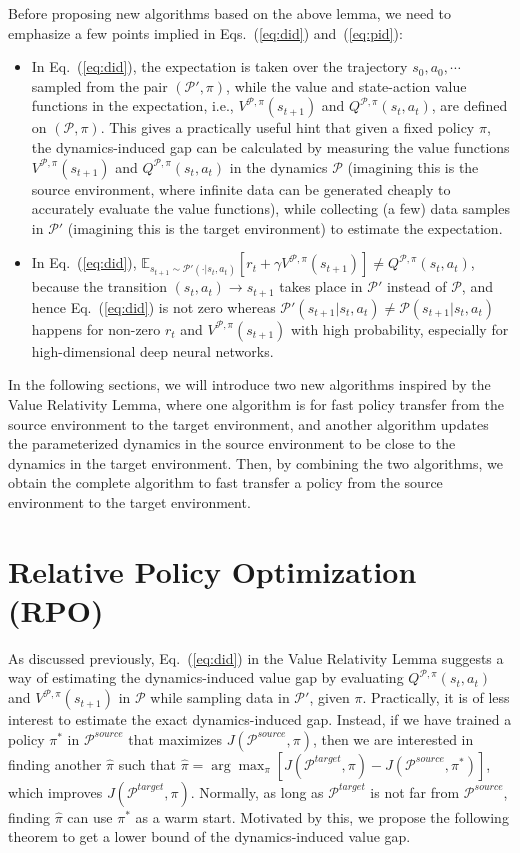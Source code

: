 \documentclass[letterpaper]{article} %
\def\E{{\mathbb{E}}}
\def\P{{\mathcal{P}}}
\begin{document}
Before proposing new algorithms based on the above lemma, we need to emphasize a few points implied in Eqs.~(\ref{eq:did}) and~(\ref{eq:pid}):
\begin{itemize}
	\item In Eq.~(\ref{eq:did}), the expectation is taken over the trajectory $s_0, a_0, \cdots$ sampled from the pair $(\P',\pi)$, while the value and state-action value functions in the expectation, i.e., $V^{\P,\pi}(s_{t+1})$ and $Q^{\P,\pi}(s_t,a_t)$, are defined on $(\P,\pi)$. This gives a practically useful hint that given a fixed policy $\pi$, the dynamics-induced gap can be calculated by measuring the value functions $V^{\P,\pi}(s_{t+1})$ and $Q^{\P,\pi}(s_t,a_t)$ in the dynamics $\P$ (imagining this is the source environment, where infinite data can be generated cheaply to accurately evaluate the value functions), while collecting (a few) data samples in $\P'$ (imagining this is the target environment) to estimate the expectation.
	\item In Eq.~(\ref{eq:did}), $\E_{s_{t+1}\sim\P'(\cdot|s_t,a_t)}[r_t+\gamma V^{\P,\pi}(s_{t+1})]\neq Q^{\P,\pi}(s_t,a_t)$, because the transition $(s_t,a_t)\xrightarrow{}s_{t+1}$ takes place in $\P'$ instead of $\P$, and hence Eq.~(\ref{eq:did}) is not zero whereas $\P'(s_{t+1}|s_t,a_t)\neq\P(s_{t+1}|s_t,a_t)$ happens for non-zero $r_t$ and $V^{\P,\pi}(s_{t+1})$ with high probability, especially for high-dimensional deep neural networks. 

\end{itemize}
In the following sections, we will introduce two new algorithms inspired by the Value Relativity Lemma, where one algorithm is for fast policy transfer from the source environment to the target environment, and another algorithm updates the parameterized dynamics in the source environment to be close to the dynamics in the target environment. Then, by combining the two algorithms, we obtain the complete algorithm to fast transfer a policy from the source environment to the target environment.

\section{Relative Policy Optimization (RPO)}
\label{sec:rpo}
As discussed previously, Eq.~(\ref{eq:did}) in the Value Relativity Lemma suggests a way of estimating the dynamics-induced value gap by evaluating $Q^{\P,\pi}(s_t,a_t)$ and $V^{\P,\pi}(s_{t+1})$ in $\P$ while sampling data in $\P'$, given $\pi$. Practically, it is of less interest to estimate the exact dynamics-induced gap. Instead, if we have trained a policy $\pi^*$ in $\P^{source}$ that maximizes $J(\P^{source},\pi)$, then we are interested in finding another $\hat{\pi}$ such that $\hat{\pi}=\arg\max_{\pi} [J(\P^{target},\pi)-J(\P^{source},\pi^*)]$, 
which improves $J(\P^{target},\pi)$. Normally, as long as $\P^{target}$ is not far from $\P^{source}$, finding $\hat{\pi}$ can use $\pi^*$ as a warm start. Motivated by this, we propose the following theorem to get a lower bound of the dynamics-induced value gap.
\end{document}
